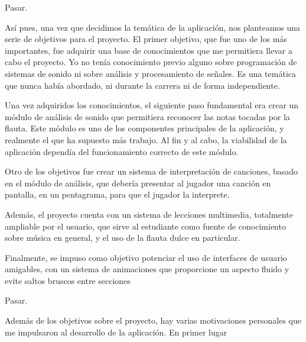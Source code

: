 \documentclass[landscape]{article}
\newenvironment{nota}
{%
\begin{framed} \noindent\itshape
}
{%
\end{framed}\vspace{-0.5cm} }
\begin{document}
\begin{multicols*}{2}
\begin{nota}
  Pasar.
\end{nota}

Así pues, una vez que decidimos la temática de la aplicación, nos planteamos una
serie de objetivos para el proyecto. El primer objetivo, que fue uno de los más
importantes, fue adquirir una base de conocimientos que me permitiera llevar a
cabo el proyecto. Yo no tenía conocimiento previo alguno sobre programación de
sistemas de sonido ni sobre análisis y procesamiento de señales. Es una temática
que nunca había abordado, ni durante la carrera ni de forma independiente.

Una vez adquiridos los conocimientos,  el siguiente paso
fundamental era crear un módulo de análisis de sonido que permitiera reconocer
las notas tocadas por la flauta. Este módulo es uno de los componentes
principales de la aplicación, y realmente el que ha supuesto más trabajo. Al fin
y al cabo, la viabilidad de la aplicación dependía del funcionamiento correcto
de este módulo. 

 Otro de los objetivos fue crear un sistema de interpretación de
canciones, basado en el módulo de análisis, que debería presentar al jugador una
canción en pantalla, en un pentagrama, para que el jugador la interprete.

 Además, el proyecto cuenta con un sistema de lecciones multimedia, totalmente
ampliable por el usuario, que sirve al estudiante como fuente de conocimiento
sobre música en general, y el uso de la flauta dulce en particular.

 Finalmente, se impuso como objetivo potenciar el uso de interfaces de usuario
amigables, con un sistema de animaciones que proporcione un aspecto fluido y
evite saltos bruscos entre secciones

\begin{nota}
  Pasar.
\end{nota}

Además de los objetivos sobre el proyecto, hay varias motivaciones personales
que me impulsaron al desarrollo de la aplicación. En primer lugar


\vfill \pagebreak


\end{multicols*}
\end{document}
